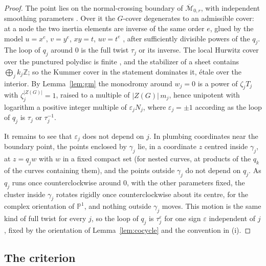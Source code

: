 \documentclass[11pt]{amsart}
\theoremstyle{definition}
\theoremstyle{remark}
\newcommand{\Z}{\mathbb Z}
\newcommand{\PP}{\mathbb P}
\begin{document}
\begin{proof}
The point lies on the normal-crossing boundary of $\overline{\mathcal M}_{0,r}$, with independent smoothing parameters \cite[Theorem~2.7]{Knudsen}. Over it the $G$-cover degenerates to an admissible cover: at a node the two inertia elements are inverse of the same order $e$, glued by the model $u=x^e$, $v=y^e$, $xy=t$, $uv=t^e$ \cite[\S4]{HarrisMumford}, after sufficiently divisible powers of the $q_j$. The loop of $q_j$ around $0$ is the full twist $\tau_j$ or its inverse. The local Hurwitz cover over the punctured polydisc is finite \cite[\S1.2]{FriedVolklein}, and the stabilizer of a sheet contains $\bigoplus_jk_j\Z$; so the Kummer cover in the statement dominates it, \'etale over the interior. By Lemma~\ref{lem:gm} the monodromy around $w_j=0$ is a power of $\zeta_jT_j$ with $\zeta_j^{|Z(G)|}=1$, raised to a multiple of $|Z(G)|\,m_j$, hence unipotent with logarithm a positive integer multiple of $\varepsilon_jN_j$, where $\varepsilon_j=\pm1$ according as the loop of $q_j$ is $\tau_j$ or $\tau_j^{-1}$.

It remains to see that $\varepsilon_j$ does not depend on $j$. In plumbing coordinates near the boundary point, the points enclosed by $\gamma_j$ lie, in a coordinate $z$ centred inside $\gamma_j$, at $z=q_jw$ with $w$ in a fixed compact set (for nested curves, at products of the $q_k$ of the curves containing them), and the points outside $\gamma_j$ do not depend on $q_j$. As $q_j$ runs once counterclockwise around $0$, with the other parameters fixed, the cluster inside $\gamma_j$ rotates rigidly once counterclockwise about its centre, for the complex orientation of $\PP^1$, and nothing outside $\gamma_j$ moves. This motion is the same kind of full twist for every $j$, so the loop of $q_j$ is $\tau_j^{\varepsilon}$ for one sign $\varepsilon$ independent of $j$, fixed by the orientation of Lemma~\ref{lem:cocycle} and the convention in (i).
\end{proof}

\subsection{The criterion}
\end{document}
